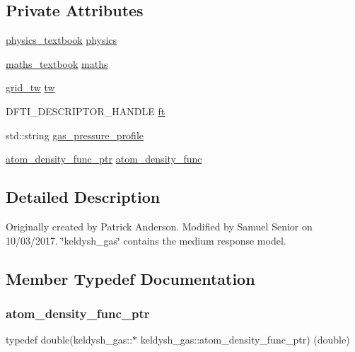 \subsection*{Private Attributes}
\begin{DoxyCompactItemize}
\item 
\mbox{\hyperlink{classphysics__textbook}{physics\+\_\+textbook}} \mbox{\hyperlink{classkeldysh__gas_a3b26e27ccf042ae2f89aa23e4252acf4}{physics}}
\item 
\mbox{\hyperlink{classmaths__textbook}{maths\+\_\+textbook}} \mbox{\hyperlink{classkeldysh__gas_a501614b541b9056bb05b378a39962524}{maths}}
\item 
\mbox{\hyperlink{classgrid__tw}{grid\+\_\+tw}} \mbox{\hyperlink{classkeldysh__gas_a1cd7129f9ba9d62f4084049e529cab49}{tw}}
\item 
D\+F\+T\+I\+\_\+\+D\+E\+S\+C\+R\+I\+P\+T\+O\+R\+\_\+\+H\+A\+N\+D\+LE \mbox{\hyperlink{classkeldysh__gas_ac635d55dcbdfcde7c34d77de5cd75af6}{ft}}
\item 
std\+::string \mbox{\hyperlink{classkeldysh__gas_a8e25aa7daf8df877e12db565294c3c72}{gas\+\_\+pressure\+\_\+profile}}
\item 
\mbox{\hyperlink{classkeldysh__gas_ab47ad59b466eee349a7500555869b988}{atom\+\_\+density\+\_\+func\+\_\+ptr}} \mbox{\hyperlink{classkeldysh__gas_aeb540c2cc32a862ab074638d53f172f7}{atom\+\_\+density\+\_\+func}}
\end{DoxyCompactItemize}


\subsection{Detailed Description}
Originally created by Patrick Anderson. Modified by Samuel Senior on 10/03/2017. \char`\"{}keldysh\+\_\+gas\char`\"{} contains the medium response model. 

\subsection{Member Typedef Documentation}
\mbox{\label{classkeldysh__gas_ab47ad59b466eee349a7500555869b988}} 
\subsubsection{\texorpdfstring{atom\_density\_func\_ptr}{atom\_density\_func\_ptr}}
{\footnotesize\ttfamily typedef double(keldysh\+\_\+gas\+::$\ast$ keldysh\+\_\+gas\+::atom\+\_\+density\+\_\+func\+\_\+ptr) (double)\hspace{0.3cm}{\ttfamily [private]}}



